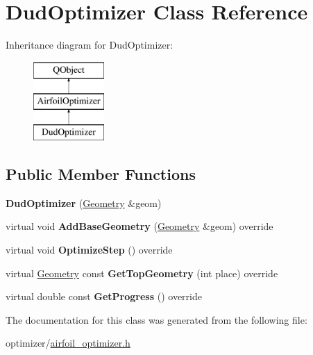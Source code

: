 \hypertarget{class_dud_optimizer}{}\section{Dud\+Optimizer Class Reference}
\label{class_dud_optimizer}
Inheritance diagram for Dud\+Optimizer\+:\begin{figure}[H]
\begin{center}
\leavevmode
\includegraphics[height=3.000000cm]{class_dud_optimizer}
\end{center}
\end{figure}
\subsection*{Public Member Functions}
\begin{DoxyCompactItemize}
\item 
\hypertarget{class_dud_optimizer_af26b9a7008edc72eab4904e4412ec807}{}\label{class_dud_optimizer_af26b9a7008edc72eab4904e4412ec807} 
{\bfseries Dud\+Optimizer} (\hyperlink{class_geometry}{Geometry} \&geom)
\item 
\hypertarget{class_dud_optimizer_ade6ed18e711d2d43967d063015f154ae}{}\label{class_dud_optimizer_ade6ed18e711d2d43967d063015f154ae} 
virtual void {\bfseries Add\+Base\+Geometry} (\hyperlink{class_geometry}{Geometry} \&geom) override
\item 
\hypertarget{class_dud_optimizer_a12ad186007710f0828cdb74818587685}{}\label{class_dud_optimizer_a12ad186007710f0828cdb74818587685} 
virtual void {\bfseries Optimize\+Step} () override
\item 
\hypertarget{class_dud_optimizer_afa2b5ba6daa5d384c005272de5d6a4c3}{}\label{class_dud_optimizer_afa2b5ba6daa5d384c005272de5d6a4c3} 
virtual \hyperlink{class_geometry}{Geometry} const {\bfseries Get\+Top\+Geometry} (int place) override
\item 
\hypertarget{class_dud_optimizer_ad5dde8e13b08b6267f34c500fa116c80}{}\label{class_dud_optimizer_ad5dde8e13b08b6267f34c500fa116c80} 
virtual double const {\bfseries Get\+Progress} () override
\end{DoxyCompactItemize}


The documentation for this class was generated from the following file\+:\begin{DoxyCompactItemize}
\item 
optimizer/\hyperlink{airfoil__optimizer_8h}{airfoil\+\_\+optimizer.\+h}\end{DoxyCompactItemize}
